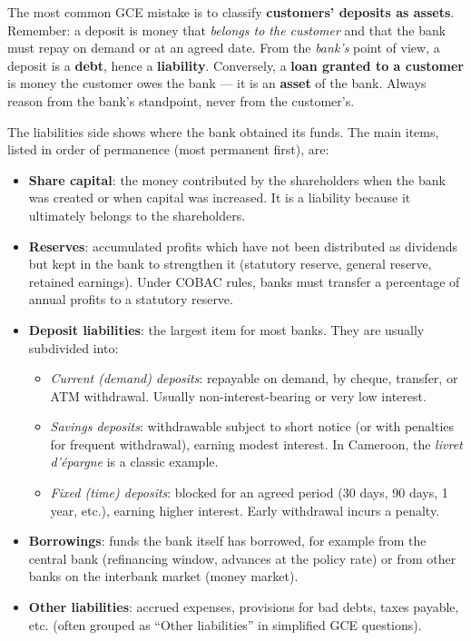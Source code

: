 \documentclass[11pt]{article}
\newcounter{popsec}
\newcounter{popsub}
\newcommand{\courssub}[1]{%
  \stepcounter{popsub}%
  \par\vspace{9pt}\noindent{\popxbold\fontsize{11.5}{13}\selectfont\color{popink}{\color{poporange}\thepopsec.\thepopsub}\hspace{6pt}#1}\par\nopagebreak\vspace{4pt}
}
\begin{document}
\begin{attention}
The most common GCE mistake is to classify \textbf{customers' deposits as assets}. Remember: a deposit is money that \emph{belongs to the customer} and that the bank must repay on demand or at an agreed date. From the \emph{bank's} point of view, a deposit is a \textbf{debt}, hence a \textbf{liability}. Conversely, a \textbf{loan granted to a customer} is money the customer owes the bank — it is an \textbf{asset} of the bank. Always reason from the bank's standpoint, never from the customer's.
\end{attention}

\courssub{The Liabilities Side: Sources of Funds}

The liabilities side shows where the bank obtained its funds. The main items, listed in order of permanence (most permanent first), are:

\begin{itemize}
\item \textbf{Share capital}: the money contributed by the shareholders when the bank was created or when capital was increased. It is a liability because it ultimately belongs to the shareholders.
\item \textbf{Reserves}: accumulated profits which have not been distributed as dividends but kept in the bank to strengthen it (statutory reserve, general reserve, retained earnings). Under COBAC rules, banks must transfer a percentage of annual profits to a statutory reserve.
\item \textbf{Deposit liabilities}: the largest item for most banks. They are usually subdivided into:
\begin{itemize}
\item \emph{Current (demand) deposits}: repayable on demand, by cheque, transfer, or ATM withdrawal. Usually non-interest-bearing or very low interest.
\item \emph{Savings deposits}: withdrawable subject to short notice (or with penalties for frequent withdrawal), earning modest interest. In Cameroon, the \emph{livret d'épargne} is a classic example.
\item \emph{Fixed (time) deposits}: blocked for an agreed period (30 days, 90 days, 1 year, etc.), earning higher interest. Early withdrawal incurs a penalty.
\end{itemize}
\item \textbf{Borrowings}: funds the bank itself has borrowed, for example from the central bank (refinancing window, advances at the policy rate) or from other banks on the interbank market (money market).
\item \textbf{Other liabilities}: accrued expenses, provisions for bad debts, taxes payable, etc. (often grouped as ``Other liabilities'' in simplified GCE questions).
\end{itemize}
\end{document}
